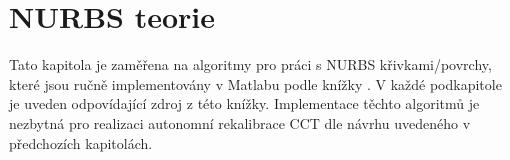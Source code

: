 \section{NURBS teorie}\label{section: NURBS teorie}
Tato kapitola je zaměřena na algoritmy pro práci s NURBS křivkami/povrchy, které jsou ručně implementovány v Matlabu podle knížky \cite{The_NURBS_Book}. V každé podkapitole je uveden odpovídající zdroj z této knížky. Implementace těchto algoritmů je nezbytná pro realizaci autonomní rekalibrace CCT dle návrhu uvedeného v předchozích kapitolách.
